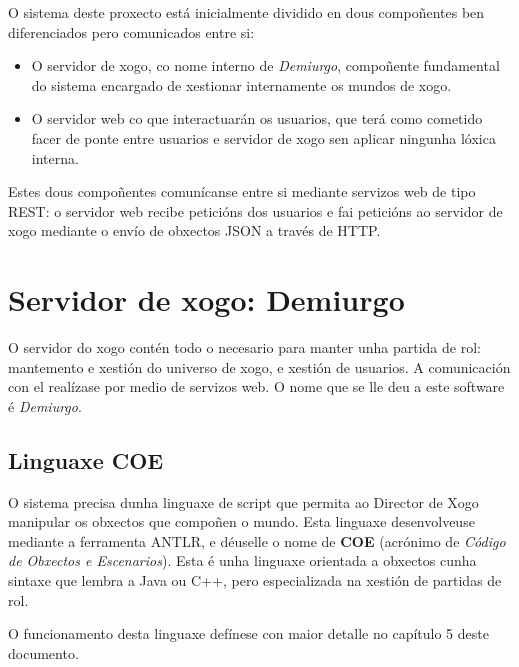 
O sistema deste proxecto está inicialmente dividido en dous compoñentes ben
diferenciados pero comunicados entre si:
\begin{itemize}
  \item O servidor de xogo, co nome interno de {\it Demiurgo},
  compoñente fundamental do sistema encargado de xestionar internamente os
  mundos de xogo.
  \item O servidor web co que interactuarán os usuarios, que terá como cometido
  facer de ponte entre usuarios e servidor de xogo sen aplicar ningunha lóxica
  interna.
\end{itemize}

Estes dous compoñentes comunícanse entre si mediante servizos web de tipo REST:
o servidor web recibe peticións dos usuarios e fai peticións ao servidor de
xogo mediante o envío de obxectos JSON a través de HTTP.

\section{Servidor de xogo: Demiurgo}
O servidor do xogo contén todo o necesario para manter unha partida de rol:
mantemento e xestión do universo de xogo, e xestión de usuarios. A comunicación
con el realízase por medio de servizos web. O nome que se lle deu a este
software é {\it Demiurgo}.
\subsection{Linguaxe COE}
O sistema precisa dunha linguaxe de script que permita ao Director de
Xogo manipular os obxectos que compoñen o mundo. Esta linguaxe desenvolveuse
mediante a ferramenta ANTLR, e déuselle o nome de {\bf COE} (acrónimo de {\it
Código de Obxectos e Escenarios}). Esta é unha linguaxe orientada a obxectos
cunha sintaxe que lembra a Java ou C++, pero especializada na xestión de
partidas de rol.
\par
O funcionamento desta linguaxe defínese con maior detalle no capítulo 5 deste
documento.

